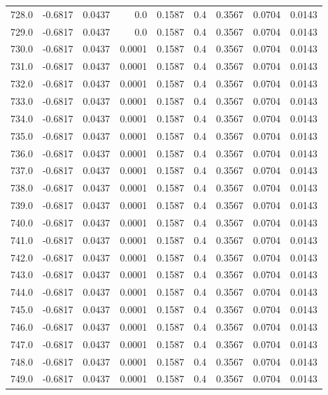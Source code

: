 \begin{longtable}{lrrrrrrrr}
728.0 & -0.6817 & 0.0437 & 0.0 & 0.1587 & 0.4 & 0.3567 & 0.0704 & 0.0143 \\
729.0 & -0.6817 & 0.0437 & 0.0 & 0.1587 & 0.4 & 0.3567 & 0.0704 & 0.0143 \\
730.0 & -0.6817 & 0.0437 & 0.0001 & 0.1587 & 0.4 & 0.3567 & 0.0704 & 0.0143 \\
731.0 & -0.6817 & 0.0437 & 0.0001 & 0.1587 & 0.4 & 0.3567 & 0.0704 & 0.0143 \\
732.0 & -0.6817 & 0.0437 & 0.0001 & 0.1587 & 0.4 & 0.3567 & 0.0704 & 0.0143 \\
733.0 & -0.6817 & 0.0437 & 0.0001 & 0.1587 & 0.4 & 0.3567 & 0.0704 & 0.0143 \\
734.0 & -0.6817 & 0.0437 & 0.0001 & 0.1587 & 0.4 & 0.3567 & 0.0704 & 0.0143 \\
735.0 & -0.6817 & 0.0437 & 0.0001 & 0.1587 & 0.4 & 0.3567 & 0.0704 & 0.0143 \\
736.0 & -0.6817 & 0.0437 & 0.0001 & 0.1587 & 0.4 & 0.3567 & 0.0704 & 0.0143 \\
737.0 & -0.6817 & 0.0437 & 0.0001 & 0.1587 & 0.4 & 0.3567 & 0.0704 & 0.0143 \\
738.0 & -0.6817 & 0.0437 & 0.0001 & 0.1587 & 0.4 & 0.3567 & 0.0704 & 0.0143 \\
739.0 & -0.6817 & 0.0437 & 0.0001 & 0.1587 & 0.4 & 0.3567 & 0.0704 & 0.0143 \\
740.0 & -0.6817 & 0.0437 & 0.0001 & 0.1587 & 0.4 & 0.3567 & 0.0704 & 0.0143 \\
741.0 & -0.6817 & 0.0437 & 0.0001 & 0.1587 & 0.4 & 0.3567 & 0.0704 & 0.0143 \\
742.0 & -0.6817 & 0.0437 & 0.0001 & 0.1587 & 0.4 & 0.3567 & 0.0704 & 0.0143 \\
743.0 & -0.6817 & 0.0437 & 0.0001 & 0.1587 & 0.4 & 0.3567 & 0.0704 & 0.0143 \\
744.0 & -0.6817 & 0.0437 & 0.0001 & 0.1587 & 0.4 & 0.3567 & 0.0704 & 0.0143 \\
745.0 & -0.6817 & 0.0437 & 0.0001 & 0.1587 & 0.4 & 0.3567 & 0.0704 & 0.0143 \\
746.0 & -0.6817 & 0.0437 & 0.0001 & 0.1587 & 0.4 & 0.3567 & 0.0704 & 0.0143 \\
747.0 & -0.6817 & 0.0437 & 0.0001 & 0.1587 & 0.4 & 0.3567 & 0.0704 & 0.0143 \\
748.0 & -0.6817 & 0.0437 & 0.0001 & 0.1587 & 0.4 & 0.3567 & 0.0704 & 0.0143 \\
749.0 & -0.6817 & 0.0437 & 0.0001 & 0.1587 & 0.4 & 0.3567 & 0.0704 & 0.0143 \\

\end{longtable}
